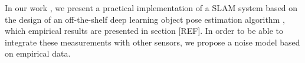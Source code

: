 In our work \cite{debeunne2021cosyslam}, we present a practical implementation of a SLAM system based on the design of an off-the-shelf deep learning object 
pose estimation algorithm \cite{labbe2020cosypose}, which empirical results are presented in section [REF]. 
In order to be able to integrate these measurements with other sensors, we propose a noise model based on empirical data.




